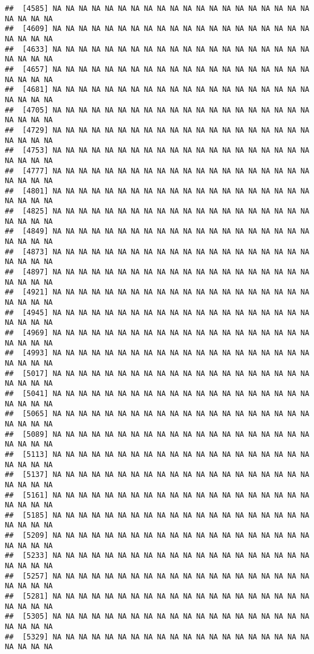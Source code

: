 \documentclass[
]{article}
\begin{document}
\begin{verbatim}
##  [4585] NA NA NA NA NA NA NA NA NA NA NA NA NA NA NA NA NA NA NA NA NA NA NA NA
##  [4609] NA NA NA NA NA NA NA NA NA NA NA NA NA NA NA NA NA NA NA NA NA NA NA NA
##  [4633] NA NA NA NA NA NA NA NA NA NA NA NA NA NA NA NA NA NA NA NA NA NA NA NA
##  [4657] NA NA NA NA NA NA NA NA NA NA NA NA NA NA NA NA NA NA NA NA NA NA NA NA
##  [4681] NA NA NA NA NA NA NA NA NA NA NA NA NA NA NA NA NA NA NA NA NA NA NA NA
##  [4705] NA NA NA NA NA NA NA NA NA NA NA NA NA NA NA NA NA NA NA NA NA NA NA NA
##  [4729] NA NA NA NA NA NA NA NA NA NA NA NA NA NA NA NA NA NA NA NA NA NA NA NA
##  [4753] NA NA NA NA NA NA NA NA NA NA NA NA NA NA NA NA NA NA NA NA NA NA NA NA
##  [4777] NA NA NA NA NA NA NA NA NA NA NA NA NA NA NA NA NA NA NA NA NA NA NA NA
##  [4801] NA NA NA NA NA NA NA NA NA NA NA NA NA NA NA NA NA NA NA NA NA NA NA NA
##  [4825] NA NA NA NA NA NA NA NA NA NA NA NA NA NA NA NA NA NA NA NA NA NA NA NA
##  [4849] NA NA NA NA NA NA NA NA NA NA NA NA NA NA NA NA NA NA NA NA NA NA NA NA
##  [4873] NA NA NA NA NA NA NA NA NA NA NA NA NA NA NA NA NA NA NA NA NA NA NA NA
##  [4897] NA NA NA NA NA NA NA NA NA NA NA NA NA NA NA NA NA NA NA NA NA NA NA NA
##  [4921] NA NA NA NA NA NA NA NA NA NA NA NA NA NA NA NA NA NA NA NA NA NA NA NA
##  [4945] NA NA NA NA NA NA NA NA NA NA NA NA NA NA NA NA NA NA NA NA NA NA NA NA
##  [4969] NA NA NA NA NA NA NA NA NA NA NA NA NA NA NA NA NA NA NA NA NA NA NA NA
##  [4993] NA NA NA NA NA NA NA NA NA NA NA NA NA NA NA NA NA NA NA NA NA NA NA NA
##  [5017] NA NA NA NA NA NA NA NA NA NA NA NA NA NA NA NA NA NA NA NA NA NA NA NA
##  [5041] NA NA NA NA NA NA NA NA NA NA NA NA NA NA NA NA NA NA NA NA NA NA NA NA
##  [5065] NA NA NA NA NA NA NA NA NA NA NA NA NA NA NA NA NA NA NA NA NA NA NA NA
##  [5089] NA NA NA NA NA NA NA NA NA NA NA NA NA NA NA NA NA NA NA NA NA NA NA NA
##  [5113] NA NA NA NA NA NA NA NA NA NA NA NA NA NA NA NA NA NA NA NA NA NA NA NA
##  [5137] NA NA NA NA NA NA NA NA NA NA NA NA NA NA NA NA NA NA NA NA NA NA NA NA
##  [5161] NA NA NA NA NA NA NA NA NA NA NA NA NA NA NA NA NA NA NA NA NA NA NA NA
##  [5185] NA NA NA NA NA NA NA NA NA NA NA NA NA NA NA NA NA NA NA NA NA NA NA NA
##  [5209] NA NA NA NA NA NA NA NA NA NA NA NA NA NA NA NA NA NA NA NA NA NA NA NA
##  [5233] NA NA NA NA NA NA NA NA NA NA NA NA NA NA NA NA NA NA NA NA NA NA NA NA
##  [5257] NA NA NA NA NA NA NA NA NA NA NA NA NA NA NA NA NA NA NA NA NA NA NA NA
##  [5281] NA NA NA NA NA NA NA NA NA NA NA NA NA NA NA NA NA NA NA NA NA NA NA NA
##  [5305] NA NA NA NA NA NA NA NA NA NA NA NA NA NA NA NA NA NA NA NA NA NA NA NA
##  [5329] NA NA NA NA NA NA NA NA NA NA NA NA NA NA NA NA NA NA NA NA NA NA NA NA

\end{verbatim}
\end{document}
